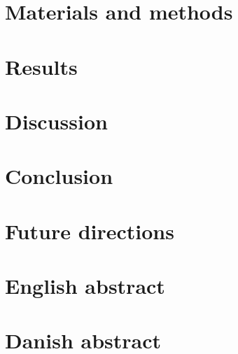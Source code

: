 \documentclass[a4paper, twoside]{report}
\begin{document}
\chapter{Materials and methods}



\chapter{Results}



\chapter{Discussion}


\chapter{Conclusion}


\chapter{Future directions}


\chapter{English abstract}


\chapter{Danish abstract}







%

%

%


\newpage
\printbibliography[heading=bibintoc,
title={References}]
\newpage
\end{document}
